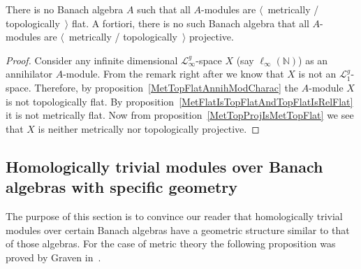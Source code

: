\begin{proposition} There is no Banach algebra $A$ such that all $A$-modules are
$\langle$~metrically / topologically~$\rangle$ flat. A fortiori, there is no
such Banach algebra that all $A$-modules are $\langle$~metrically /
topologically~$\rangle$ projective.
\end{proposition}
\begin{proof} Consider any infinite dimensional $\mathscr{L}_\infty^g$-space $X$
(say $\ell_\infty(\mathbb{N})$) as an annihilator $A$-module. From the remark right
after \cite[corollary 23.3]{DefFloTensNorOpId} we know that $X$ is not an
$\mathscr{L}_1^g$-space. Therefore, by proposition~\ref{MetTopFlatAnnihModCharac}
the $A$-module $X$ is not topologically flat. By
proposition~\ref{MetFlatIsTopFlatAndTopFlatIsRelFlat} it is not metrically flat.
Now from proposition~\ref{MetTopProjIsMetTopFlat} we see that $X$ is neither
metrically nor topologically projective.
\end{proof}


\subsection{
    Homologically trivial modules over Banach algebras with specific geometry}\label{
    SubSectionHomologicallyTrivialModulesOverBanachAlgebrasWithSpecificGeometry
}

The purpose of this section is to convince our reader that homologically trivial
modules over certain Banach algebras have a geometric structure similar to that of those
algebras. For the case of metric theory the following proposition was proved by
Graven in~\cite{GravInjProjBanMod}.

